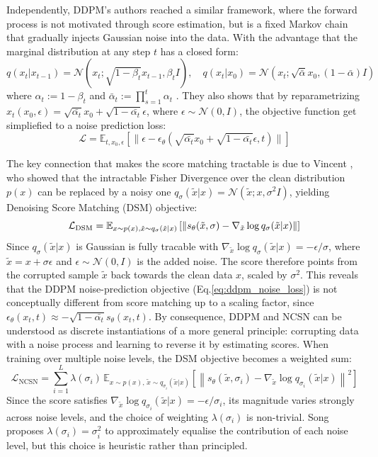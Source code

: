 Independently, DDPM's authors \cite{ho2020ddpm} reached a similar framework, where the forward process is not motivated through score estimation, but is a fixed Markov chain that gradually injects Gaussian noise into the data. With the advantage that the marginal distribution at any step \(t\) has a closed form:
$$q(x_t|x_{t-1})=\mathcal{N}\left(x_t;\sqrt{1-\beta_t}x_{t-1}, \beta_tI\right), \quad q(x_t|x_0)=\mathcal{N}\left(x_t;\sqrt{\bar{\alpha}}x_0, (1-\bar{\alpha})I\right)$$
where \(\alpha_t:=1-\beta_t\) and \(\bar{\alpha}_t:=\prod_{s=1}^t\alpha_t\) \cite{ho2020ddpm}. They also shows that by reparametrizing \(x_t(x_0,\epsilon)=\sqrt{\bar{\alpha_t}}x_0+\sqrt{1-\bar{\alpha_t}}\epsilon\), where \(\epsilon \sim \mathcal{N}(0,I)\), the objective function get simpliefied to a noise prediction loss:
\begin{equation}
\label{eq:ddpm_noise_loss}
\mathcal{L}=\mathbb{E}_{t,x_0,\epsilon}\left[\|\epsilon -\epsilon_\theta(\sqrt{\bar{\alpha_t}}x_0+\sqrt{1-\bar{\alpha_t}}\epsilon,t)\|\right]  
\end{equation}

The key connection that makes the score matching tractable is due to Vincent \cite{vincent2011connection}, who showed that the intractable Fisher Divergence over the clean distribution \(p(x)\) can be replaced by a noisy one \(q_\sigma(\tilde{x}|x)=\mathcal{N}\left(\tilde{x};x,\sigma^2I\right)\), yielding Denoising Score Matching (DSM) objective:
$$\mathcal{L}_{\text{DSM}}=\mathbb{E}_{x\sim p(x),\space \tilde{x}\sim q_\sigma(\tilde{x}|x)}\left[\|s_\theta(\tilde{x},\sigma)-\nabla_{\tilde{x}} \log q_\sigma(\tilde{x}|x)\| \right]$$Since \(q_\sigma(\tilde{x}|x)\) is Gaussian is fully tracable with \(\nabla_{\tilde{x}} \log q_\sigma(\tilde{x}|x)=-\epsilon/\sigma\), where \(\tilde{x}=x+\sigma\epsilon\) and \(\epsilon\sim\mathcal{N}(0,I)\) is the added noise. The score therefore points from the corrupted sample \(\tilde{x}\) back towards the clean data \(x\), scaled by \(\sigma^2\). This reveals that the DDPM noise-prediction objective (Eq.\ref{eq:ddpm_noise_loss}) 
is not conceptually different from score matching up to a scaling factor, since 
$\epsilon_\theta(x_t,t)\approx -\sqrt{1-\bar{\alpha_t}}s_\theta(x_t,t)$. By 
consequence, DDPM and NCSN can be understood as discrete instantiations of a more 
general principle: corrupting data with a noise process and learning to reverse it 
by estimating scores. When training over multiple noise levels, the DSM objective 
becomes a weighted sum:
$$
\mathcal{L}_{\text{NCSN}} = \sum_{i=1}^{L} \lambda(\sigma_i)\,
\mathbb{E}_{x\sim p(x),\,\tilde{x}\sim q_{\sigma_i}(\tilde{x}|x)}
\left[\left\|s_\theta(\tilde{x}, \sigma_i) - 
\nabla_{\tilde{x}}\log q_{\sigma_i}(\tilde{x}|x)\right\|^2\right]
$$
Since the score satisfies $\nabla_{\tilde{x}}\log q_{\sigma_i}(\tilde{x}|x) = 
-\epsilon/\sigma_i$, its magnitude varies strongly across noise levels, and the 
choice of weighting $\lambda(\sigma_i)$ is non-trivial. Song \cite{song2019generative} 
proposes $\lambda(\sigma_i) = \sigma_i^2$ to approximately equalise the contribution 
of each noise level, but this choice is heuristic rather than principled.\\

